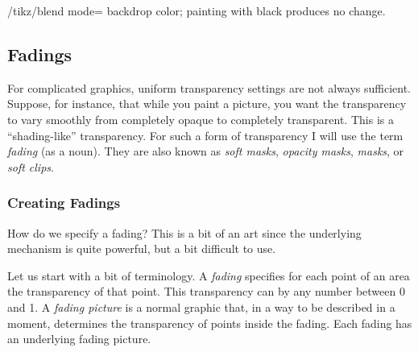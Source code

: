 \begin{key}{/tikz/blend mode=}
{      backdrop color; painting with black produces no change.}
  
\end{key}



\subsection{Fadings}

For complicated graphics, uniform transparency settings are not always
sufficient. Suppose, for instance, that while you paint a picture, you
want the transparency to vary smoothly from completely opaque to
completely transparent. This is a ``shading-like'' transparency. For
such a form of transparency I will use the term \emph{fading} (as a
noun). They are also known as \emph{soft masks}, \emph{opacity masks},
\emph{masks}, or \emph{soft clips}.


\subsubsection{Creating Fadings}

How do we specify a fading? This is a bit of an art since the
underlying mechanism is quite powerful, but a bit difficult to use.

Let us start with a bit of terminology. A \emph{fading} specifies for
each point of an area the transparency of that point. This transparency
can by any number between 0 and 1. A \emph{fading picture} is a normal
graphic that, in a way to be described in a moment, determines the
transparency of points inside the fading. Each fading has an
underlying fading picture.

